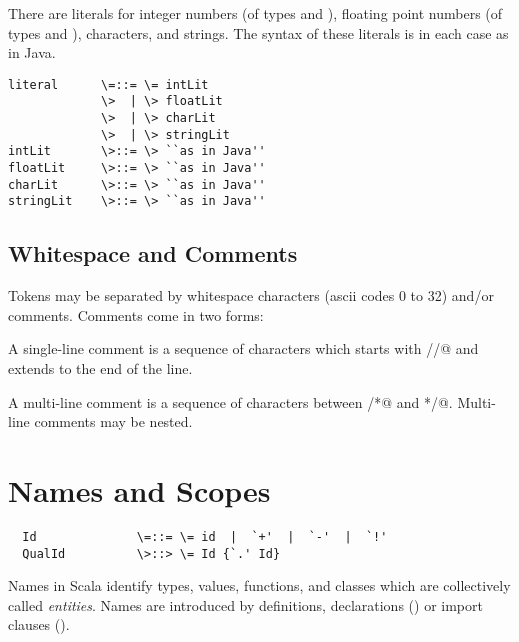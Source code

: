 \documentclass[11pt]{report}
\newcommand{\ifqualified}[1]{}
\begin{document}
There are literals for integer numbers (of types \verb@Int@ and \verb@Long@),
floating point numbers (of types \verb@Float@ and \verb@Double@), characters, and
strings.  The syntax of these literals is in each case as in Java.

\syntax\begin{verbatim}
literal      \=::= \= intLit
             \>  | \> floatLit
             \>  | \> charLit
             \>  | \> stringLit
intLit       \>::= \> ``as in Java''
floatLit     \>::= \> ``as in Java''
charLit      \>::= \> ``as in Java''
stringLit    \>::= \> ``as in Java''
\end{verbatim}

\section{Whitespace and Comments}

Tokens may be separated by whitespace characters (ascii codes 0 to 32)
and/or comments. Comments come in two forms:

A single-line comment is a sequence of characters which starts with
\verb@//@ and extends to the end of the line.

A multi-line comment is a sequence of characters between \verb@/*@ and
\verb@*/@. Multi-line comments may be nested.


\chapter{\label{sec:names}Names and Scopes}

\syntax\begin{verbatim}
  Id              \=::= \= id  |  `+'  |  `-'  |  `!'
  QualId          \>::> \= Id {`.' Id}
\end{verbatim}

Names in Scala identify types, values, functions, and classes which
are collectively called {\em entities}.  Names are introduced by
definitions, declarations () or import clauses
().

\ifqualified{
Parameter clauses (\sref{sec:funsigs}),
definitions that are local to a block (\sref{sec:blocks}), and import
clauses always introduce {\em simple names} $x$, which consist of a
single identifier.  On the other hand, definitions and declarations
that form part of a module (\sref{sec:modules}) or a class
(\sref{sec:classes}) conceptually always introduce {\em qualified
names}\nyi{Qualified names are}
$Q\qex x$ where a simple name $x$ comes with a qualified
identifier $Q$. $Q$ is either the fully qualified name of a module or
class which is labelled
\verb@qualified@, or it is the empty name $\epsilon$.

The {\em fully qualified name} of a module or class $M[targs]$ with
simple name $M$ and type arguments $[targs]$ is
\begin{itemize}
\item $Q.M$, if the definition of $M$ appears in the template defining
a module or class with fully qualified name $Q$.
\item
$M$ if the definition of $M$ appears on the top-level or as a definition
in a block.
\end{itemize}
}
\end{document}
